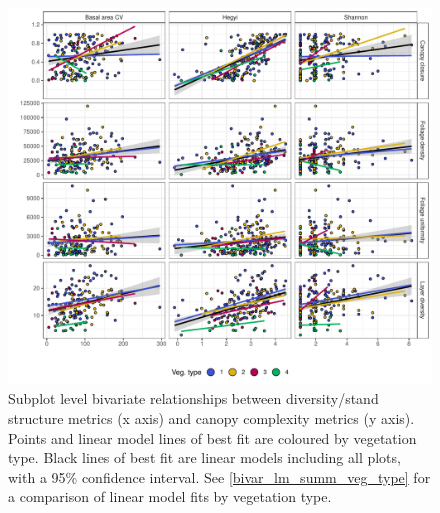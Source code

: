 \documentclass[11pt,a4paper]{article}
\begin{document}
\begin{figure}
	\includegraphics[width=\linewidth]{bivar_subplot}
	\caption[Bivariate plots comparing diversity, stand structure and canopy complexity]{Subplot level bivariate relationships between diversity/stand structure metrics (x axis) and canopy complexity metrics (y axis). Points and linear model lines of best fit are coloured by vegetation type. Black lines of best fit are linear models including all plots, with a 95\% confidence interval. See \autoref{bivar_lm_summ_veg_type} for a comparison of linear model fits by vegetation type.}
	\label{subplot_bivar}
\end{figure}
\end{document}
